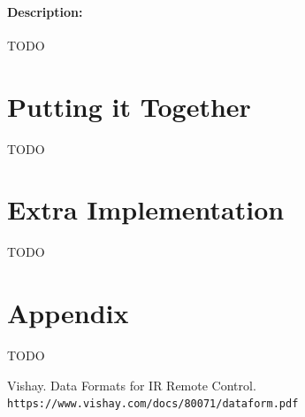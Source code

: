 \documentclass[]{article}
\begin{document}
\paragraph{Description:} TODO

\section{Putting it Together}
TODO

\section{Extra Implementation}
TODO
\section{Appendix}
TODO

\begin{thebibliography}{99}
    Vishay. Data Formats for IR Remote Control. 
    \\\texttt{https://www.vishay.com/docs/80071/dataform.pdf}
\end{thebibliography}
\end{document}
